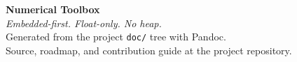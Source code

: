 \cleardoublepage
\thispagestyle{empty}
\vspace*{\fill}
\begin{center}
{\Large\bfseries\color{RoyalBlue} Numerical Toolbox}\\[0.5em]
{\itshape Embedded-first. Float-only. No heap.}\\[2em]
Generated from the project \texttt{doc/} tree with Pandoc.\\
Source, roadmap, and contribution guide at the project repository.
\end{center}
\vspace*{\fill}

